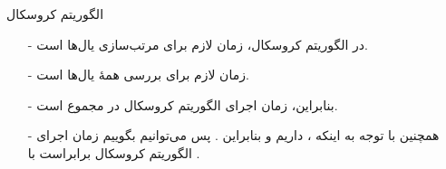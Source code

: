 \begin{frame}{‌الگوریتم کروسکال}
\begin{itemize}\itemr

\item[-]
در الگوریتم کروسکال،
زمان لازم برای مرتب‌سازی یال‌ها
است.
\item[-]
زمان لازم برای بررسی همهٔ یال‌ها
است.
\item[-]
بنابراین، زمان اجرای الگوریتم کروسکال در مجموع
است.
\item[-]
همچنین با توجه به اینکه
، داریم
و بنابراین
 .
پس می‌توانیم بگوییم زمان اجرای الگوریتم کروسکال برابراست با
 .
\end{itemize}
\end{frame}
